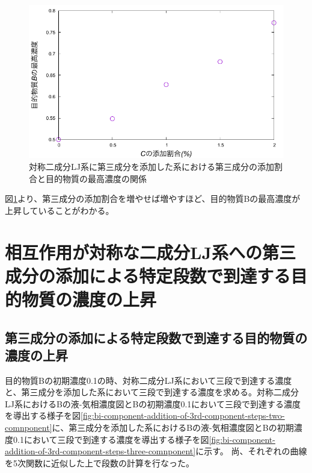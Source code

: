 \documentclass[titlepage]{jsreport}
\begin{document}
\begin{figure}[htbp]
    \begin{center}
        \includegraphics[width=14cm]{fig/3rd-component-addition-ratio-highest-purity/3rd-component-addition-ratio-highest-purity.pdf}
    \end{center}
    \caption{対称二成分LJ系に第三成分を添加した系における第三成分の添加割合と目的物質の最高濃度の関係}
    \label{fig:bi-component-addition-of-3rd-component-addition-ratio-highest-purity}
\end{figure}

\newpage
図\ref{fig:bi-component-addition-of-3rd-component-addition-ratio-highest-purity}より、第三成分の添加割合を増やせば増やすほど、目的物質Bの最高濃度が上昇していることがわかる。


\section{相互作用が対称な二成分LJ系への第三成分の添加による特定段数で到達する目的物質の濃度の上昇} \label{results-sec:bi-component-addition-of-3rd-component-steps}
\subsection{第三成分の添加による特定段数で到達する目的物質の濃度の上昇} \label{results-subsec:bi-component-addition-of-3rd-component-steps}
目的物質Bの初期濃度0.1の時、対称二成分LJ系において三段で到達する濃度と、第三成分を添加した系において三段で到達する濃度を求める。対称二成分LJ系におけるBの液-気相濃度図とBの初期濃度0.1において三段で到達する濃度を導出する様子を図\ref{fig:bi-component-addition-of-3rd-component-steps-two-comnponent}に、第三成分を添加した系におけるBの液-気相濃度図とBの初期濃度0.1において三段で到達する濃度を導出する様子を図\ref{fig:bi-component-addition-of-3rd-component-steps-three-comnponent}に示す。
尚、それぞれの曲線を5次関数に近似した上で段数の計算を行なった。
\end{document}
